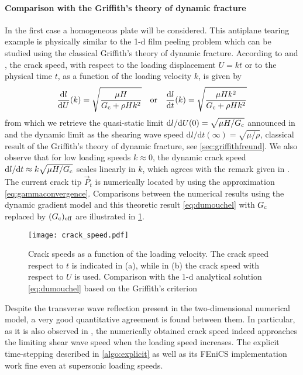 \paragraph{Comparison with the Griffith's theory of dynamic fracture} In the first case a homogeneous plate will be considered. This antiplane tearing example is physically similar to the 1-d film peeling problem which can be studied using the classical Griffith's theory of dynamic fracture. According to \cite{DumouchelMarigoCharlotte:2008} and \cite{BourdinFrancfortMarigo:2008}, the crack speed, with respect to the loading displacement $U=kt$ or to the physical time $t$, as a function of the loading velocity $k$, is given by
\begin{equation} \label{eq:dumouchel}
\frac{\mathrm{d} l}{\mathrm{d} U}(k)=\sqrt{\frac{\mu H}{G_\mathrm{c}+\rho Hk^2}}\quad\text{or}\quad\frac{\mathrm{d} l}{\mathrm{d} t}(k)=\sqrt{\frac{\mu Hk^2}{G_\mathrm{c}+\rho Hk^2}}
\end{equation}
from which we retrieve the quasi-static limit $\mathrm{d} l/\mathrm{d} U(0)=\sqrt{\mu H/G_\mathrm{c}}$ announced in \cite{BourdinFrancfortMarigo:2008} and the dynamic limit as the shearing wave speed $\mathrm{d} l/\mathrm{d} t(\infty)=\sqrt{\mu/\rho}$, classical result of the Griffith's theory of dynamic fracture, see \cref{sec:griffithfreund}. We also observe that for low loading speeds $k\approx 0$, the dynamic crack speed $\mathrm{d} l/\mathrm{d} t\approx k\sqrt{\mu H/G_\mathrm{c}}$ scales linearly in $k$, which agrees with the remark given in \cite{Bourdin:2011}. The current crack tip $\vec{P}_t$ is numerically located by using the approximation \eqref{eq:gammaconvergence}. Comparisons between the numerical results using the dynamic gradient model and this theoretic result \eqref{eq:dumouchel} with $G_\mathrm{c}$ replaced by $(G_\mathrm{c})_\mathrm{eff}$ are illustrated in \cref{fig:mode3}.
\begin{figure}[htbp]
\centering
\texttt{[image: crack\_speed.pdf]}
\caption{Crack speeds as a function of the loading velocity. The crack speed respect to $t$ is indicated in (a), while in (b) the crack speed with respect to $U$ is used. Comparison with the 1-d analytical solution \eqref{eq:dumouchel} based on the Griffith's criterion} \label{fig:mode3}
\end{figure}
Despite the transverse wave reflection present in the two-dimensional numerical model, a very good quantitative agreement is found between them. In particular, as it is also observed in \cite{Bourdin:2011}, the numerically obtained crack speed indeed approaches the limiting shear wave speed when the loading speed increases. The explicit time-stepping described in \cref{algo:explicit} as well as its FEniCS implementation work fine even at supersonic loading speeds.

